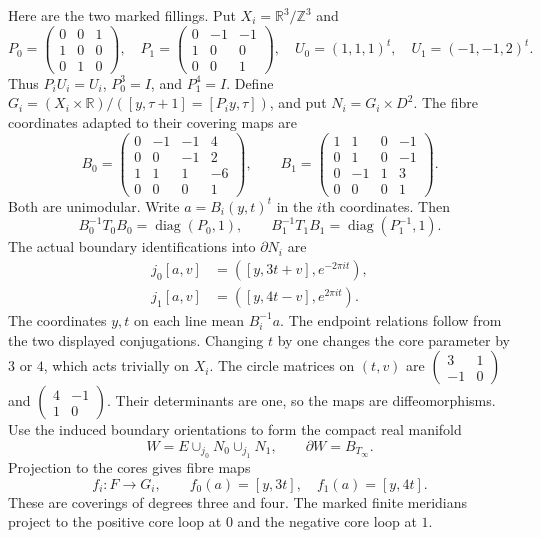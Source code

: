 Here are the two marked fillings.
Put $X_i=\mathbb R^3/\mathbb Z^3$ and
\[
P_0=\begin{pmatrix}0&0&1\\1&0&0\\0&1&0\end{pmatrix},\quad
P_1=\begin{pmatrix}0&-1&-1\\1&0&0\\0&0&1\end{pmatrix},\quad
U_0=(1,1,1)^t,\quad U_1=(-1,-1,2)^t.
\]
Thus $P_iU_i=U_i$, $P_0^3=I$, and $P_1^4=I$.
Define $G_i=(X_i\times\mathbb R)/([y,\tau+1]=[P_i y,\tau])$,
and put $N_i=G_i\times D^2$.
The fibre coordinates adapted to their covering maps are
\begin{equation}\label{mt:eq:B}
B_0=\begin{pmatrix}0&-1&-1&4\\0&0&-1&2\\1&1&1&-6\\0&0&0&1\end{pmatrix},\qquad
B_1=\begin{pmatrix}1&1&0&-1\\0&1&0&-1\\0&-1&1&3\\0&0&0&1\end{pmatrix}.
\end{equation}
Both are unimodular. Write $a=B_i(y,t)^t$ in the $i$th coordinates.
Then
\[
B_0^{-1}T_0B_0=\operatorname{diag}(P_0,1),\qquad
B_1^{-1}T_1B_1=\operatorname{diag}(P_1^{-1},1).
\]
The actual boundary identifications into $\partial N_i$ are
\begin{equation}\label{mt:eq:j}
\begin{aligned}
j_0[a,v]&=([y,3t+v],e^{-2\pi it}),\\
j_1[a,v]&=([y,4t-v],e^{2\pi it}).
\end{aligned}
\end{equation}
The coordinates $y,t$ on each line mean $B_i^{-1}a$.
The endpoint relations follow from the two displayed conjugations.
Changing $t$ by one changes the core parameter by $3$ or $4$,
which acts trivially on $X_i$.
The circle matrices on $(t,v)$ are
$\left(\begin{smallmatrix}3&1\\-1&0\end{smallmatrix}\right)$ and
$\left(\begin{smallmatrix}4&-1\\1&0\end{smallmatrix}\right)$.
Their determinants are one, so the maps are diffeomorphisms.
Use the induced boundary orientations to form the compact real manifold
\begin{equation}\label{mt:eq:W}
W=E\cup_{j_0}N_0\cup_{j_1}N_1,\qquad \partial W=B_{T_\infty}.
\end{equation}
Projection to the cores gives fibre maps
\begin{equation}\label{mt:eq:f}
f_i:F\longrightarrow G_i,\qquad
f_0(a)=[y,3t],\quad f_1(a)=[y,4t].
\end{equation}
These are coverings of degrees three and four.
The marked finite meridians project to the positive core loop at $0$
and the negative core loop at $1$.


